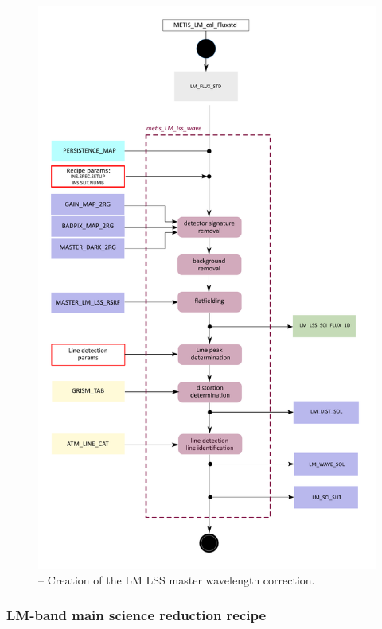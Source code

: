 \begin{figure}[ht]
  \centering
  \includegraphics[width=0.5\textheight]{figures/metis_lm_lss_wave_0.62.pdf}
  \caption[Recipe: ]{ --
    Creation of the LM LSS master wavelength correction.}
  \label{Fig:rec_lm_lss_wave}
\end{figure}
\clearpage

\subsubsection{LM-band main science reduction recipe}\label{subsubsection:LM_LSS_sci}

